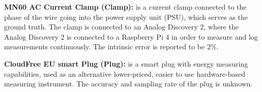 \noindent\textbf{MN60 AC Current Clamp (Clamp):} is a current clamp connected to the phase of the wire going into the power supply unit (PSU), which serves as the ground truth. The clamp is connected to an Analog Discovery 2, where the Analog Discovery 2 is connected to a Raspberry Pi 4 in order to measure and log measurements continuously.\cite{biksbois} The intrinsic error is reported to be $2\%$\cite{ClampDoc}.\newline

\noindent\textbf{CloudFree EU smart Plug (Plug):} is a smart plug with energy measuring capabilities, used as an alternative lower-priced, easier to use hardware-based measuring instrument. The accuracy and sampling rate of the plug is unknown.\cite{CloudFreeEUSMartPlug}\newline